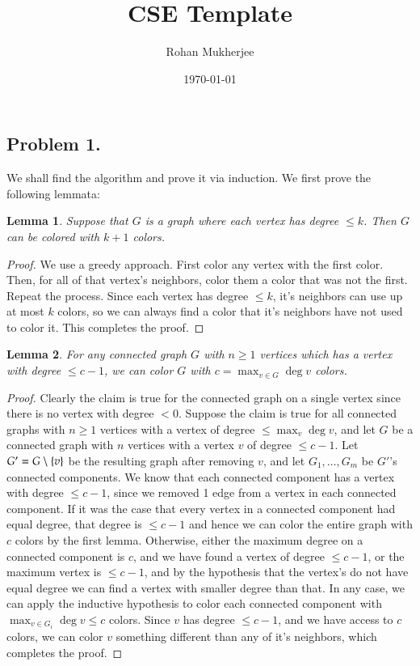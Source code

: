 \documentclass[12pt]{article}
\title{CSE Template}
\date{\today}
\author{Rohan Mukherjee}
\newtheorem{lemma}{Lemma}
\theoremstyle{definitionstyle}
\newcommand{\SET}[1]{\Set{\mskip-\medmuskip #1 \mskip-\medmuskip}}
\begin{document}
    \maketitle
    \subsection*{Problem 1.}
    We shall find the algorithm and prove it via induction. We first prove the following lemmata:

    \begin{lemma}
        Suppose that $G$ is a graph where each vertex has degree $\leq k$. Then $G$ can be colored with $k+1$ colors.
    \end{lemma}
    \begin{proof}
        We use a greedy approach. First color any vertex with the first color. Then, for all of that vertex's neighbors, color them a color that was not the first. Repeat the process. Since each vertex has degree $\leq k$, it's neighbors can use up at most $k$ colors, so we can always find a color that it's neighbors have not used to color it. This completes the proof.
    \end{proof}

    \begin{lemma}
        For any connected graph $G$ with $n \geq 1$ vertices which has a vertex with degree $\leq c-1$, we can color $G$ with $c = \max_{v \in G} \deg v$ colors.
    \end{lemma}
    \begin{proof}
        Clearly the claim is true for the connected graph on a single vertex since there is no vertex with degree $< 0$. Suppose the claim is true for all connected graphs with $n \geq 1$ vertices with a vertex of degree $\leq \max_v \deg v$, and let $G$ be a connected graph with $n$ vertices with a vertex $v$ of degree $\leq c-1$. Let $G' = G \setminus \SET{v}$ be the resulting graph after removing $v$, and let $G_1, \ldots, G_m$ be $G'$'s connected components. We know that each connected component has a vertex with degree $\leq c-1$, since we removed 1 edge from a vertex in each connected component. If it was the case that every vertex in a connected component had equal degree, that degree is $\leq c-1$ and hence we can color the entire graph with $c$ colors by the first lemma. Otherwise, either the maximum degree on a connected component is $c$, and we have found a vertex of degree $\leq c-1$, or the maximum vertex is $\leq c-1$, and by the hypothesis that the vertex's do not have equal degree we can find a vertex with smaller degree than that. In any case, we can apply the inductive hypothesis to color each connected component with $\max_{v \in G_i} \deg v \leq c$ colors. Since $v$ has degree $\leq c-1$, and we have access to $c$ colors, we can color $v$ something different than any of it's neighbors, which completes the proof.
    \end{proof}
\end{document}
